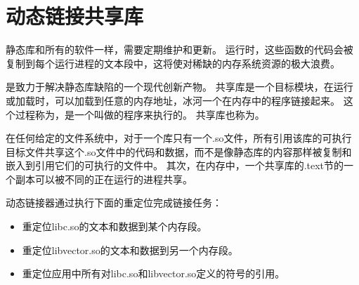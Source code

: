 
\section{动态链接共享库}
{
    静态库和所有的软件一样，需要定期维护和更新。
    运行时，这些函数的代码会被复制到每个运行进程的文本段中，这将使对稀缺的内存系统资源的极大浪费。

    是致力于解决静态库缺陷的一个现代创新产物。
    共享库是一个目标模块，在运行或加载时，可以加载到任意的内存地址，冰河一个在内存中的程序链接起来。
    这个过程称为，是一个叫做的程序来执行的。
    共享库也称为。

    在任何给定的文件系统中，对于一个库只有一个.so文件，所有引用该库的可执行目标文件共享这个.so文件中的代码和数据，而不是像静态库的内容那样被复制和嵌入到引用它们的可执行的文件中。
    其次，在内存中，一个共享库的.text节的一个副本可以被不同的正在运行的进程共享。

    动态链接器通过执行下面的重定位完成链接任务：

    \begin{itemize}
        \item 重定位libc.so的文本和数据到某个内存段。
        \item 重定位libvector.so的文本和数据到另一个内存段。
        \item 重定位应用中所有对libc.so和libvector.so定义的符号的引用。
    \end{itemize}
}
